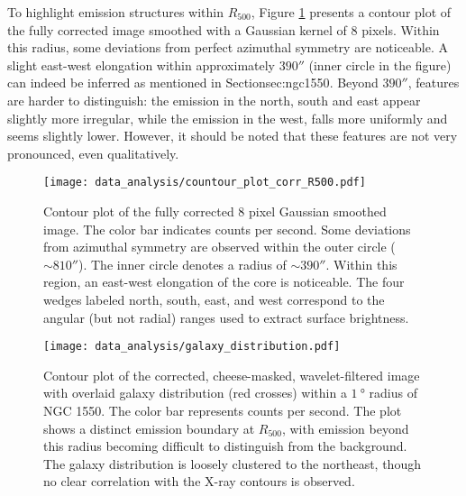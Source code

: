 To highlight emission structures within \(R_{500}\), Figure \ref{fig:contour_fully_corrected} presents a contour plot of the fully corrected image smoothed with a Gaussian kernel of \(8\) pixels. Within this radius, some deviations from perfect azimuthal symmetry are noticeable. A slight east-west elongation within approximately \(390''\) (inner circle in the figure) can indeed be inferred as mentioned in Section{sec:ngc1550}. Beyond \(390''\), features are harder to distinguish: the emission in the north, south and east appear slightly more irregular, while the emission in the west, falls more uniformly and seems slightly lower. However, it should be noted that these features are not very pronounced, even qualitatively.
\begin{figure}[htbp]
    \centering
    \texttt{[image: data\_analysis/countour\_plot\_corr\_R500.pdf]}
    \caption{Contour plot of the fully corrected 8 pixel Gaussian smoothed image. The color bar indicates counts per second. Some deviations from azimuthal symmetry are observed within the outer circle (\(\sim 810''\)). The inner circle denotes a radius of \(\sim 390''\). Within this region, an east-west elongation of the core is noticeable. The four wedges labeled north, south, east, and west correspond to the angular (but not radial) ranges used to extract surface brightness.}
    \label{fig:contour_fully_corrected}
\end{figure}
\begin{figure}[htbp]
    \centering
    \texttt{[image: data\_analysis/galaxy\_distribution.pdf]}
    \caption{Contour plot of the corrected, cheese-masked, wavelet-filtered image with overlaid galaxy distribution (red crosses) within a \(\SI{1}{\degree}\) radius of NGC 1550. The color bar represents counts per second. The plot shows a distinct emission boundary at \(R_{500}\), with emission beyond this radius becoming difficult to distinguish from the background. The galaxy distribution is loosely clustered to the northeast, though no clear correlation with the X-ray contours is observed.}
    \label{fig:contour_wvl_filtered}
\end{figure}
